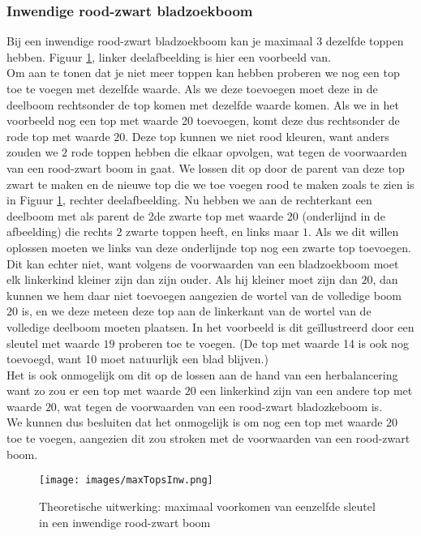 \documentclass[11pt,a4paper]{report}
\begin{document}
\subsubsection*{Inwendige rood-zwart bladzoekboom}
Bij een inwendige rood-zwart bladzoekboom kan je maximaal $3$ dezelfde toppen hebben. Figuur \ref{maxTopInw}, linker deelafbeelding is hier een voorbeeld van.\\
Om aan te tonen dat je niet meer toppen kan hebben proberen we nog een top toe te voegen met dezelfde waarde. Als we deze toevoegen moet deze in de deelboom rechtsonder de top komen met dezelfde waarde komen. Als we in het voorbeeld nog een top met waarde 20 toevoegen, komt deze dus rechtsonder de rode top met waarde $20$. Deze top kunnen we niet rood kleuren, want anders zouden we $2$ rode toppen hebben die elkaar opvolgen, wat tegen de voorwaarden van een rood-zwart boom in gaat. We lossen dit op door de parent van deze top zwart te maken en de nieuwe top die we toe voegen rood te maken zoals te zien is in Figuur \ref{maxTopInw}, rechter deelafbeelding. Nu hebben we aan de rechterkant een deelboom met als parent de 2de zwarte top met waarde 20 (onderlijnd in de afbeelding) die rechts $2$ zwarte toppen heeft, en links maar $1$. Als we dit willen oplossen moeten we links van deze onderlijnde top nog een zwarte top toevoegen. Dit kan echter niet, want volgens de voorwaarden van een bladzoekboom moet elk linkerkind kleiner zijn dan zijn ouder. Als hij kleiner moet zijn dan $20$, dan kunnen we hem daar niet toevoegen aangezien de wortel van de volledige boom $20$ is, en we deze meteen deze top aan de linkerkant van de wortel van de volledige deelboom moeten plaatsen. In het voorbeeld is dit ge\"illustreerd door een sleutel met waarde $19$ proberen toe te voegen. (De top met waarde 14 is ook nog toevoegd, want 10 moet natuurlijk een blad blijven.)\\
Het is ook onmogelijk om dit op de lossen aan de hand van een herbalancering want zo zou er een top met waarde $20$ een linkerkind zijn van een andere top met waarde $20$, wat tegen de voorwaarden van een rood-zwart bladozkeboom is.\\
We kunnen dus besluiten dat het onmogelijk is om nog een top met waarde $20$ toe te voegen, aangezien dit zou stroken met de voorwaarden van een rood-zwart boom.
\begin{figure}[h!]
	\centering
		\texttt{[image: images/maxTopsInw.png]}
	\caption{Theoretische uitwerking: maximaal voorkomen van eenzelfde sleutel in een inwendige rood-zwart boom}
	\label{maxTopInw}
\end{figure}
\end{document}
